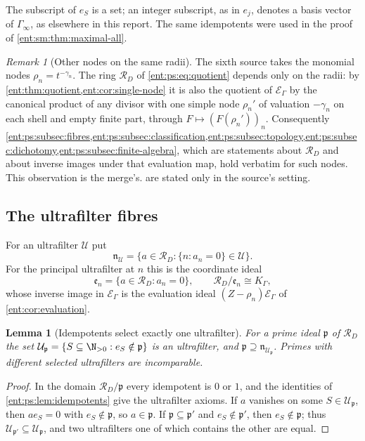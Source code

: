 \documentclass[11pt]{article}
\theoremstyle{plain}
\newtheorem{lemma}[lemma]{Lemma}
\theoremstyle{plain}
\theoremstyle{plain}
\theoremstyle{definition}
\theoremstyle{definition}
\theoremstyle{definition}
\theoremstyle{definition}
\theoremstyle{remark}
\newtheorem{remark}[remark]{Remark}
\newcommand{\RD}{\mathcal R_D}\newcommand{\Ucal}{\mathcal U}
\begin{document}
The subscript of $e_S$ is a set; an integer subscript, as in $e_j$, denotes a
basis vector of $\Gamma_\infty$, as elsewhere in this report. The same
idempotents were used in the proof of \cref{ent:sm:thm:maximal-all}.

\begin{remark}[Other nodes on the same radii]\label{ent:ps:rem:nodes}
The sixth source takes the monomial nodes $\rho_n=t^{-\gamma_n}$. The ring
$\RD$ of \eqref{ent:ps:eq:quotient} depends only on the radii: by
\cref{ent:thm:quotient,ent:cor:single-node} it is also the quotient of
$\mathcal E_\Gamma$ by the canonical product of any divisor with one simple
node $\rho_n'$ of valuation $-\gamma_n$ on each shell and empty finite part,
through $F\mapsto(F(\rho_n'))_n$. Consequently
\cref{ent:ps:subsec:fibres,ent:ps:subsec:classification,ent:ps:subsec:topology,ent:ps:subsec:dichotomy,ent:ps:subsec:finite-algebra},
which are statements about $\RD$ and about inverse images under that
evaluation map, hold verbatim for such nodes. This observation is the
merge's. 
are stated only in the source's setting.
\end{remark}

\subsection{The ultrafilter fibres}
\label{ent:ps:subsec:fibres}

For an ultrafilter $\Ucal$ put
\begin{equation}\label{ent:ps:eq:nU}
 \mathfrak n_\Ucal=\{a\in\RD:\{n:a_n=0\}\in\Ucal\}.
\end{equation}
For the principal ultrafilter at $n$ this is the coordinate ideal
\[
 \mathfrak e_n=\{a\in\RD:a_n=0\},\qquad \RD/\mathfrak e_n\cong K_\Gamma,
\]
whose inverse image in $\mathcal E_\Gamma$ is the evaluation ideal
$(Z-\rho_n)\mathcal E_\Gamma$ of \cref{ent:cor:evaluation}.

\begin{lemma}[Idempotents select exactly one ultrafilter]
\label{ent:ps:lem:ultrafilter}
For a prime ideal $\mathfrak p$ of $\RD$ the set
$\Ucal_{\mathfrak p}=\{S\subseteq\N_{>0}:e_S\notin\mathfrak p\}$ is an
ultrafilter, and $\mathfrak p\supseteq\mathfrak n_{\Ucal_{\mathfrak p}}$.
Primes with different selected ultrafilters are incomparable.
\end{lemma}
\begin{proof}
In the domain $\RD/\mathfrak p$ every idempotent is $0$ or $1$, and the
identities of \cref{ent:ps:lem:idempotents} give the ultrafilter axioms. If
$a$ vanishes on some $S\in\Ucal_{\mathfrak p}$, then $ae_S=0$ with
$e_S\notin\mathfrak p$, so $a\in\mathfrak p$. If
$\mathfrak p\subseteq\mathfrak p'$ and $e_S\notin\mathfrak p'$, then
$e_S\notin\mathfrak p$; thus $\Ucal_{\mathfrak p'}\subseteq\Ucal_{\mathfrak
p}$, and two ultrafilters one of which contains the other are equal.
\end{proof}
\end{document}
